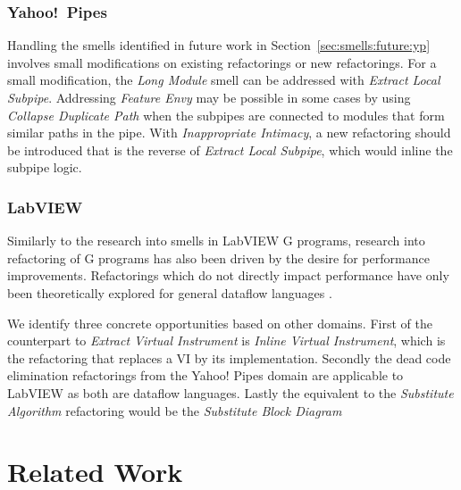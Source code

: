 \documentclass[10pt,conference,compsocconf]{IEEEtran}
\begin{document}
\subsubsection{Yahoo!\ Pipes}
Handling the smells identified in future work in Section~\ref{sec:smells:future:yp} involves small modifications on existing refactorings or new refactorings. For a small modification, the \emph{Long Module} smell can be addressed with \emph{Extract Local Subpipe}. 
Addressing \emph{Feature Envy} may be possible in some cases by using \emph{Collapse Duplicate Path} when the subpipes are connected to modules that form similar paths in the pipe.
With \emph{Inappropriate Intimacy}, a new refactoring should be introduced that is the reverse of \emph{Extract Local Subpipe}, which would inline the subpipe logic. 


\subsubsection{LabVIEW}

Similarly to the research into smells in LabVIEW G programs, research into refactoring of G programs has also been driven by the desire for performance improvements. Refactorings which do not directly impact performance have only been theoretically explored for general dataflow languages \cite{sui2008automated}.

We identify three concrete opportunities based on other domains.
First of the counterpart to \emph{Extract Virtual Instrument} is \emph{Inline Virtual Instrument}, which is the refactoring that replaces a VI by its implementation.
Secondly the dead code elimination refactorings from the Yahoo! Pipes domain are applicable to LabVIEW as both are dataflow languages.
Lastly the equivalent to the \emph{Substitute Algorithm} refactoring would be the \emph{Substitute Block Diagram}

\section{Related Work}
\end{document}
